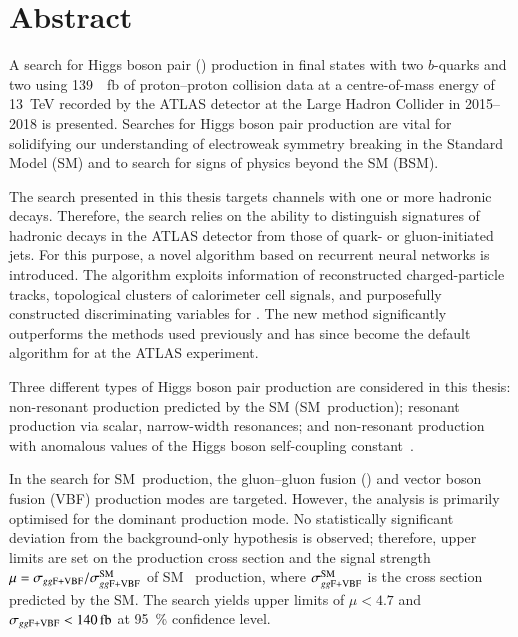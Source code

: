 \chapter*{Abstract}

A search for Higgs boson pair (\HH) production in final states with two
$b$-quarks and two \tauleptons using \SI{139}{\per\femto\barn} of proton--proton
collision data at a centre-of-mass energy of \SI{13}{\TeV} recorded by the ATLAS
detector at the Large Hadron Collider in 2015--2018 is presented. Searches for
Higgs boson pair production are vital for solidifying our understanding of
electroweak symmetry breaking in the Standard Model (SM) and to search for signs
of physics beyond the SM (BSM).

The search presented in this thesis targets channels with one or more hadronic
\taulepton decays. Therefore, the search relies on the ability to distinguish
signatures of hadronic \taulepton decays in the ATLAS detector from those of
quark- or gluon-initiated jets. For this purpose, a novel \tauid algorithm based
on recurrent neural networks is introduced. The algorithm exploits information
of reconstructed charged-particle tracks, topological clusters of calorimeter
cell signals, and purposefully constructed discriminating variables for
\tauid. The new \tauid method significantly outperforms the methods used
previously and has since become the default algorithm for \tauid at the ATLAS
experiment.

Three different types of Higgs boson pair production are considered in this
thesis: non-resonant \HH production predicted by the SM (SM~\HH production);
resonant \HH production via scalar, narrow-width resonances; and non-resonant
\HH production with anomalous values of the Higgs boson self-coupling
constant~\lambdahhh.

In the search for SM~\HH production, the gluon--gluon fusion (\ggF) and vector
boson fusion (VBF) production modes are targeted. However, the analysis is
primarily optimised for the dominant \ggF production mode. No statistically
significant deviation from the background-only hypothesis is observed;
therefore, upper limits are set on the production cross section \xsecggfvbf and
the signal strength~$\mu = \sigma_{gg\text{F+VBF}} / \sigma_{gg\text{F+VBF}}^{\text{SM}}$ of SM~\HH
production, where $\sigma_{gg\text{F+VBF}}^{\text{SM}}$ is the cross section predicted by
the SM. The search yields upper limits of $\mu < \num{4.7}$ and
$\xsecggfvbf < \SI{140}{\femto\barn}$ at \SI{95}{\percent} confidence level.

